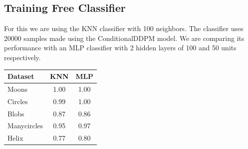 \documentclass[11pt]{article}
\begin{document}
\subsection{Training Free Classifier}

For this we are using the KNN classifier with 100 neighbors. The classifier uses 20000 samples made using the ConditionalDDPM model.
We are comparing its performance with an MLP classifier with 2 hidden layers of 100 and 50 units respectively.

\begin{longtable}{|l|c|c|}
    \hline
    \textbf{Dataset} & \textbf{KNN} & \textbf{MLP} \\
    \hline
    Moons & 1.00 & 1.00 \\
    Circles & 0.99 & 1.00 \\
    Blobs & 0.87 & 0.86 \\
    Manycircles & 0.95 & 0.97 \\
    Helix & 0.77 & 0.80 \\
    \hline
\end{longtable}

\end{document}
